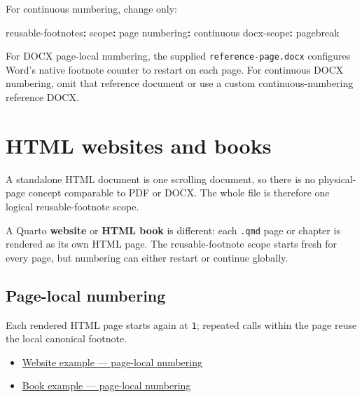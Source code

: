 \documentclass[
  letterpaper,
  DIV=11,
  numbers=noendperiod]{scrartcl}
\newenvironment{Shaded}{\begin{snugshade}}{\end{snugshade}}
\newcommand{\AttributeTok}[1]{\textcolor[rgb]{0.40,0.45,0.13}{#1}}
\newcommand{\FunctionTok}[1]{\textcolor[rgb]{0.28,0.35,0.67}{#1}}
\newcommand{\KeywordTok}[1]{\textcolor[rgb]{0.00,0.23,0.31}{\textbf{#1}}}
\providecommand{\tightlist}{%
  \setlength{\itemsep}{0pt}\setlength{\parskip}{0pt}}
\begin{document}
For continuous numbering, change only:

\begin{Shaded}
\begin{Highlighting}[]
\FunctionTok{reusable{-}footnotes}\KeywordTok{:}
\AttributeTok{  }\FunctionTok{scope}\KeywordTok{:}\AttributeTok{ page}
\AttributeTok{  }\FunctionTok{numbering}\KeywordTok{:}\AttributeTok{ continuous}
\AttributeTok{  }\FunctionTok{docx{-}scope}\KeywordTok{:}\AttributeTok{ pagebreak}
\end{Highlighting}
\end{Shaded}

For DOCX page-local numbering, the supplied \texttt{reference-page.docx}
configures Word's native footnote counter to restart on each page. For
continuous DOCX numbering, omit that reference document or use a custom
continuous-numbering reference DOCX.

\section{HTML websites and books}\label{html-websites-and-books}

A standalone HTML document is one scrolling document, so there is no
physical-page concept comparable to PDF or DOCX. The whole file is
therefore one logical reusable-footnote scope.

A Quarto \textbf{website} or \textbf{HTML book} is different: each
\texttt{.qmd} page or chapter is rendered as its own HTML page. The
reusable-footnote scope starts fresh for every page, but numbering can
either restart or continue globally.

\subsection{Page-local numbering}\label{page-local-numbering}

Each rendered HTML page starts again at \texttt{1}; repeated calls
within the page reuse the local canonical footnote.

\begin{itemize}
\tightlist
\item
  \href{https://github.com/lsbjordao/quarto-reusable-footnotes/tree/main/examples/website}{Website
  example --- page-local numbering}
\item
  \href{https://github.com/lsbjordao/quarto-reusable-footnotes/tree/main/examples/book}{Book
  example --- page-local numbering}
\end{itemize}
\end{document}
